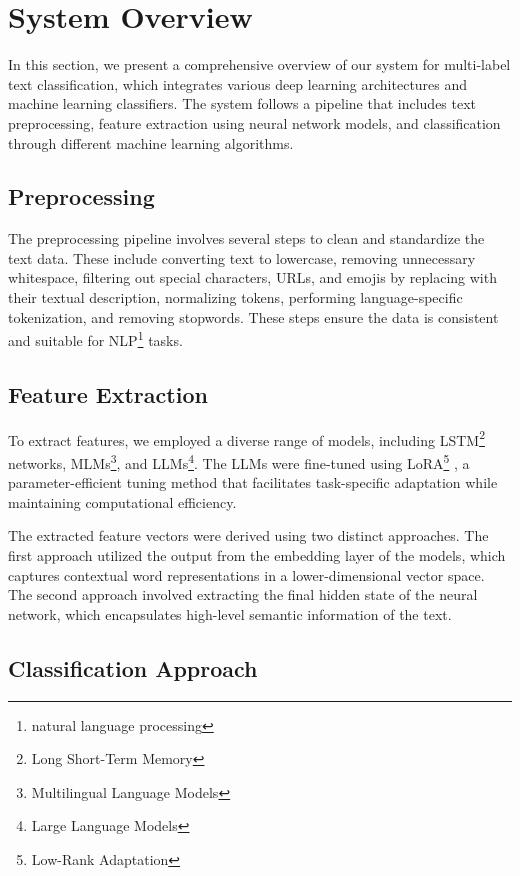 \section{System Overview}

In this section, we present a comprehensive overview of our system for multi-label text classification, which integrates various deep learning architectures and machine learning classifiers. The system follows a pipeline that includes text preprocessing, feature extraction using neural network models, and classification through different machine learning algorithms.

\subsection{Preprocessing}

The preprocessing pipeline involves several steps to clean and standardize the text data. These include converting text to lowercase, removing unnecessary whitespace, filtering out special characters, URLs, and emojis by replacing with their textual description, normalizing tokens, performing language-specific tokenization, and removing stopwords. These steps ensure the data is consistent and suitable for NLP\footnote{natural language processing} tasks.

\subsection{Feature Extraction}

To extract features, we employed a diverse range of models, including LSTM\footnote{Long Short-Term Memory} networks, MLMs\footnote{Multilingual Language Models}, and LLMs\footnote{Large Language Models}. The LLMs were fine-tuned using LoRA\footnote{Low-Rank Adaptation} \citep{hu2021lora}, a parameter-efficient tuning method that facilitates task-specific adaptation while maintaining computational efficiency.

The extracted feature vectors were derived using two distinct approaches. The first approach utilized the output from the embedding layer of the models, which captures contextual word representations in a lower-dimensional vector space. The second approach involved extracting the final hidden state of the neural network, which encapsulates high-level semantic information of the text.

\subsection{Classification Approach}

